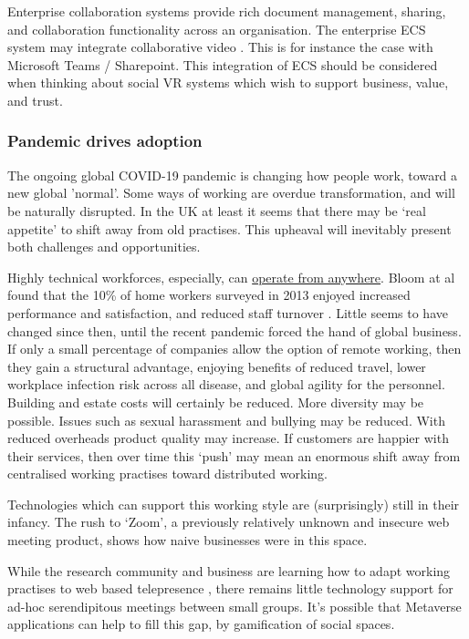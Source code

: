 Enterprise collaboration systems provide rich document management, sharing, and collaboration functionality across an organisation. The enterprise ECS system may integrate collaborative video \cite{prakash2020characteristic}. This is for instance the case with Microsoft Teams / Sharepoint. This integration of ECS should be considered when thinking about social VR systems which wish to support business, value, and trust.\par
\subsubsection{Pandemic drives adoption}
The ongoing global COVID-19 pandemic is changing how people work, toward a new global 'normal'. Some ways of working are overdue transformation, and will be naturally disrupted. In the UK at least it seems that there may be `real appetite' to shift away from old practises. This upheaval will inevitably present both challenges and opportunities.\par
Highly technical workforces, especially, can \href{https://globalworkplaceanalytics.com/telecommuting-statistics}{operate from anywhere}. Bloom at al found that the 10\% of home workers surveyed in 2013 enjoyed increased performance and satisfaction, and reduced staff turnover \cite{Bloom2015}. Little seems to have changed since then, until the recent pandemic forced the hand of global business. If only a small percentage of companies allow the option of remote working, then they gain a structural advantage, enjoying benefits of reduced travel, lower workplace infection risk across all disease, and global agility for the personnel. Building and estate costs will certainly be reduced. More diversity may be possible. Issues such as sexual harassment and bullying may be reduced.  With reduced overheads product quality may increase. If customers are happier with their services, then over time this `push' may mean an enormous shift away from centralised working practises toward distributed working. \par
Technologies which can support this working style are (surprisingly) still in their infancy. The rush to `Zoom', a previously relatively unknown and insecure \cite{aiken2020zooming} web meeting product, shows how naive businesses were in this space. \par
While the research community and business are learning how to adapt working practises to web based telepresence \cite{oeppen2020human}, there remains little technology support for ad-hoc serendipitous meetings between small groups. It's possible that Metaverse applications can help to fill this gap, by gamification of social spaces.\par

